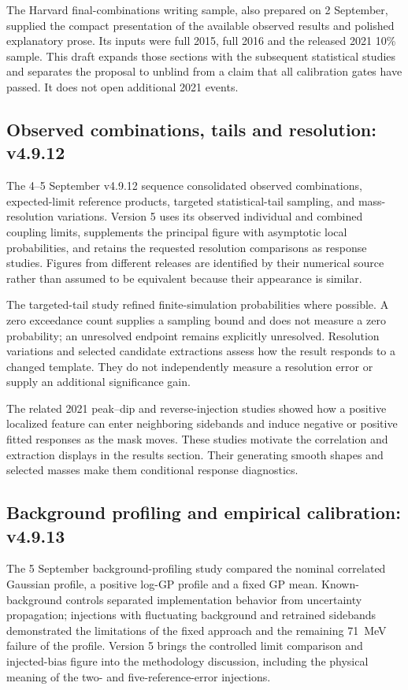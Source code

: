 The Harvard final-combinations writing sample, also prepared on
2 September, supplied the compact presentation of the available observed
results and polished explanatory prose. Its inputs were full 2015,
full 2016 and the released 2021 10\% sample. This draft expands those
sections with the subsequent statistical studies and separates the
proposal to unblind from a claim that all calibration gates have passed.
It does not open additional 2021 events.

\subsection{Observed combinations, tails and resolution: v4.9.12}
The 4--5 September v4.9.12 sequence consolidated observed combinations,
expected-limit reference products, targeted statistical-tail sampling,
and mass-resolution variations. Version 5 uses its observed individual
and combined coupling limits, supplements the principal figure with
asymptotic local probabilities, and retains the requested resolution
comparisons as response studies. Figures from different releases are
identified by their numerical source rather than assumed to be equivalent
because their appearance is similar.

The targeted-tail study refined finite-simulation probabilities where
possible. A zero exceedance count supplies a sampling bound and does
not measure a zero probability; an unresolved endpoint remains
explicitly unresolved. Resolution variations and selected candidate
extractions assess how the result responds to a changed template.
They do not independently measure a resolution error or supply an
additional significance gain.

The related 2021 peak--dip and reverse-injection studies showed how a
positive localized feature can enter neighboring sidebands and induce
negative or positive fitted responses as the mask moves. These studies
motivate the correlation and extraction displays in the results section.
Their generating smooth shapes and selected masses make them conditional
response diagnostics.

\subsection{Background profiling and empirical calibration: v4.9.13}
The 5 September background-profiling study compared the nominal
correlated Gaussian profile, a positive log-GP profile and a fixed GP
mean. Known-background controls separated implementation behavior from
uncertainty propagation; injections with fluctuating background and
retrained sidebands demonstrated the limitations of the fixed approach
and the remaining 71~MeV failure of the profile.
Version 5 brings the controlled limit comparison and injected-bias figure
into the methodology discussion, including the physical meaning of the
two- and five-reference-error injections.

